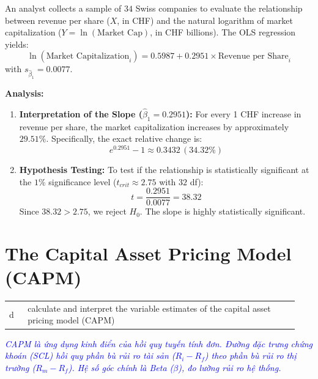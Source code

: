 \begin{tcolorbox}[
	colback=gray!5!white,
	colframe=black!15!white,
	boxrule=0.5pt,
	arc=3pt,
	title=\textbf{Example: Log-Lin Regression of Swiss Company Cap on Revenue},
	coltitle=black,
	colbacktitle=black!5!white,
	before skip=6pt,
	after skip=6pt,
	breakable
]
An analyst collects a sample of $34$ Swiss companies to evaluate the relationship between revenue per share ($X$, in CHF) and the natural logarithm of market capitalization ($Y = \ln(\text{Market Cap})$, in CHF billions). The OLS regression yields:
\[ \ln(\text{Market Capitalization}_i) = 0.5987 + 0.2951 \times \text{Revenue per Share}_i \]
with $s_{\hat{\beta}_1} = 0.0077$.

\textbf{Analysis:}
\begin{enumerate}
	\item \textbf{Interpretation of the Slope ($\hat{\beta}_1 = 0.2951$):}
	For every 1 CHF increase in revenue per share, the market capitalization increases by approximately $29.51\%$.
	Specifically, the exact relative change is:
	\[ e^{0.2951} - 1 \approx 0.3432 \, (34.32\%) \]
	\item \textbf{Hypothesis Testing:}
	To test if the relationship is statistically significant at the $1\%$ significance level ($t_{crit} \approx 2.75$ with $32$ df):
	\[ t = \frac{0.2951}{0.0077} = 38.32 \]
	Since $38.32 > 2.75$, we reject $H_0$. The slope is highly statistically significant.
\end{enumerate}
\end{tcolorbox}

\section{The Capital Asset Pricing Model (CAPM)}
\label{sec:CAPM}

\begin{center}
\begin{tabular}{p{0.06\linewidth} | p{0.88\linewidth}}
	d & calculate and interpret the variable estimates of the capital asset pricing model (CAPM) \\
\end{tabular}
\end{center}

\textcolor{blue}{\textit{CAPM là ứng dụng kinh điển của hồi quy tuyến tính đơn. Đường đặc trưng chứng khoán (SCL) hồi quy phần bù rủi ro tài sản ($R_i - R_f$) theo phần bù rủi ro thị trường ($R_m - R_f$). Hệ số góc chính là Beta ($\beta$), đo lường rủi ro hệ thống.}}

